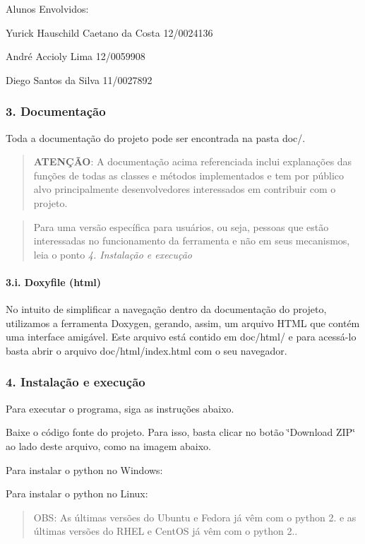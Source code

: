 Alunos Envolvidos\-:
\begin{DoxyItemize}
\item Yurick Hauschild Caetano da Costa 12/0024136
\item André Accioly Lima 12/0059908
\item Diego Santos da Silva 11/0027892
\end{DoxyItemize}

\subsubsection*{3. Documentação}

Toda a documentação do projeto pode ser encontrada na pasta doc/.

\begin{quotation}
{\bfseries A\-T\-E\-NÇÃ\-O}\-: A documentação acima referenciada inclui explanações das funções de todas as classes e métodos implementados e tem por público alvo principalmente desenvolvedores interessados em contribuir com o projeto.

\end{quotation}


\begin{quotation}
Para uma versão específica para usuários, ou seja, pessoas que estão interessadas no funcionamento da ferramenta e não em seus mecanismos, leia o ponto {\itshape 4. Instalação e execução}

\end{quotation}


\paragraph*{3.\-i. Doxyfile (html)}

No intuito de simplificar a navegação dentro da documentação do projeto, utilizamos a ferramenta Doxygen, gerando, assim, um arquivo H\-T\-M\-L que contém uma interface amigável. Este arquivo está contido em doc/html/ e para acessá-\/lo basta abrir o arquivo doc/html/index.\-html com o seu navegador.

\subsubsection*{4. Instalação e execução}

Para executar o programa, siga as instruções abaixo.


\begin{DoxyEnumerate}
\item Baixe o código fonte do projeto. Para isso, basta clicar no botão \char`\"{}\-Download Z\-I\-P\char`\"{} ao lado deste arquivo, como na imagem abaixo. 
\item Para instalar o python no Windows\-:
\item Para instalar o python no Linux\-: \begin{quotation}
O\-B\-S\-: As últimas versões do Ubuntu e Fedora já vêm com o python 2. e as últimas versões do R\-H\-E\-L e Cent\-O\-S já vêm com o python 2..

\end{quotation}

\end{DoxyEnumerate}

